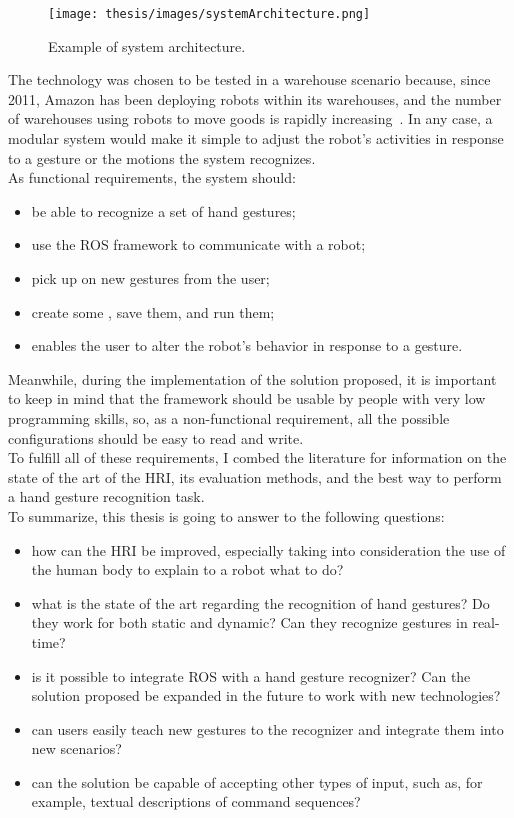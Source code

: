 \documentclass[../thesis.tex]{subfiles}
\begin{document}
\begin{figure}
  \centering
  \texttt{[image: thesis/images/systemArchitecture.png]}
  \caption{Example of system architecture.}
  \label{fig:systemArchitecture}
\end{figure}

The technology was chosen to be tested in a warehouse scenario because, since 2011, Amazon has been deploying robots within its warehouses, and the number of warehouses using robots to move goods is rapidly increasing~\cite{paper:bogue2016}. In any case, a modular system would make it simple to adjust the robot's activities in response to a gesture or the motions the system recognizes.\\

As functional requirements, the system should:
\begin{itemize}
    \item be able to recognize a set of hand gestures;
    \item use the \gls{ROS} framework to communicate with a robot;
    \item pick up on new gestures from the user;
    \item create some , save them, and run them;
    \item enables the user to alter the robot's behavior in response to a gesture.
\end{itemize}
Meanwhile, during the implementation of the solution proposed, it is important to keep in mind that the framework should be usable by people with very low programming skills, so, as a non-functional requirement, all the possible configurations should be easy to read and write.\\

To fulfill all of these requirements, I combed the literature for information on the state of the art of the \acrshort{HRI}, its evaluation methods, and the best way to perform a hand gesture recognition task.\\

To summarize, this thesis is going to answer to the following questions:
\begin{itemize}
    \item how can the \acrlong{HRI} be improved, especially taking into consideration the use of the human body to explain to a robot what to do?
    \item what is the state of the art regarding the recognition of hand gestures? Do they work for both static and dynamic? Can they recognize gestures in real-time?
    \item is it possible to integrate \gls{ROS} with a hand gesture recognizer? Can the solution proposed be expanded in the future to work with new technologies?
    \item can users easily teach new gestures to the recognizer and integrate them into new scenarios?
    \item can the solution be capable of accepting other types of input, such as, for example, textual descriptions of command sequences?
\end{itemize}
\end{document}
